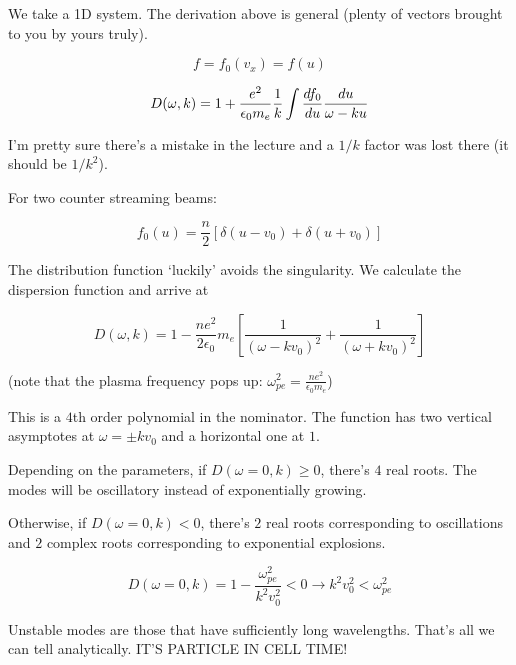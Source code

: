 We take a 1D system. The derivation above is general (plenty of vectors brought to you by yours truly). 

\[f=f_0(v_x) = f(u)\]

\[ D(\omega, k) = 1 + \frac{e^2}{\epsilon_0 m_e} \frac{1}{k} \int \frac{d f_0}{d u} \frac{du}{\omega-k u} \]

I'm pretty sure there's a mistake in the lecture and a $1/k$ factor was lost there (it should be $1/k^2$).

For two counter streaming beams:

\[ f_0 (u) =\frac{n}{2} [\delta(u-v_0) + \delta(u+v_0)] \]

The distribution function `luckily' avoids the singularity. We calculate the dispersion function and arrive at

\[D(\omega, k) = 1- \frac{n e^2}{2 \epsilon_0}{m_e} [\frac{1}{(\omega-k v_0)^2} + \frac{1}{(\omega + k v_0)^2} ] \]

(note that the plasma frequency pops up: $\omega^2_{pe} = \frac{n e^2}{\epsilon_0 m_e}$)

This is a $4$th order polynomial in the nominator. The function has two vertical asymptotes at $\omega = \pm k v_0$ and a horizontal one at $1$.

Depending on the parameters, if $D(\omega=0, k) \geq 0$, there's $4$ real roots. The modes will be oscillatory instead of exponentially growing.

Otherwise, if $D(\omega = 0, k) < 0$, there's $2$ real roots corresponding to oscillations and $2$ complex roots corresponding to exponential explosions.

\[ D(\omega =0, k) = 1 - \frac{\omega_{pe}^2}{k^2 v_0^2} < 0 \rightarrow k^2 v_0^2 < \omega_{pe}^2 \]

Unstable modes are those that have sufficiently long wavelengths. That's all we can tell analytically. IT'S PARTICLE IN CELL TIME!
